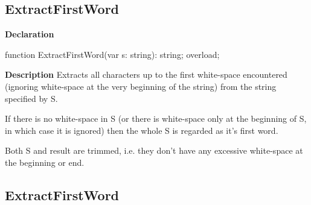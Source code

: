 \documentclass{report}
\newif\ifpdf
\begin{document}
\subsection*{ExtractFirstWord}
\fi
\label{PasDoc_Utils-ExtractFirstWord}
\begin{list}{}{
\setlength{\itemindent}{0cm}
\setlength{\listparindent}{0cm}
\setlength{\leftmargin}{\evensidemargin}
\addtolength{\leftmargin}{\tmplength}
\settowidth{\labelsep}{X}
\addtolength{\leftmargin}{\labelsep}
\setlength{\labelwidth}{\tmplength}
}
\item[\textbf{Declaration}\hfill]
\ifpdf
\begin{flushleft}
\fi
\begin{ttfamily}
function ExtractFirstWord(var s: string): string; overload;\end{ttfamily}

\ifpdf
\end{flushleft}
\fi

\par
\item[\textbf{Description}]
Extracts all characters up to the first white{-}space encountered (ignoring white{-}space at the very beginning of the string) from the string specified by S.

If there is no white{-}space in S (or there is white{-}space only at the beginning of S, in which case it is ignored) then the whole S is regarded as it's first word.

Both S and result are trimmed, i.e. they don't have any excessive white{-}space at the beginning or end.

\end{list}
\ifpdf
\subsection*{\large{\textbf{ExtractFirstWord}}\normalsize\hspace{1ex}\hrulefill}
\else
\end{document}
